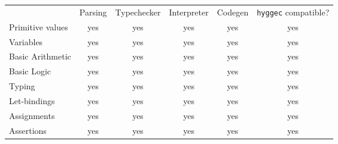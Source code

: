 \begin{table}[H]
\centering
\begin{tabular}{lccccc}
\multicolumn{1}{l|}{}       & \multicolumn{1}{l}{Parsing} & \multicolumn{1}{l}{Typechecker} & \multicolumn{1}{l}{Interpreter} & \multicolumn{1}{l}{Codegen} & \multicolumn{1}{l}{\texttt{hyggec} compatible?} \\ \cline{1-1}
Primitive values             & yes                                & yes                              & yes                                & yes                                & yes                                                              \\
Variables                    & yes                                & yes                              & yes                                & yes                                & yes                                                              \\
Basic Arithmetic  & yes                                & yes                              & yes                                & yes                                & yes                                                              \\
Basic Logic   & yes                                & yes                              & yes                                & yes                                & yes                                                              \\
Typing                       & yes                                & yes                              & yes                                & yes                                & yes                                                              \\
Let-bindings                 & yes                                & yes                              & yes                                & yes                                & yes                                                              \\
Assignments                  & yes                                & yes                              & yes                                & yes                                & yes                                                              \\
Assertions                   & yes                                & yes                              & yes                                & yes                                & yes                                                              \\

\end{tabular}
\end{table}
